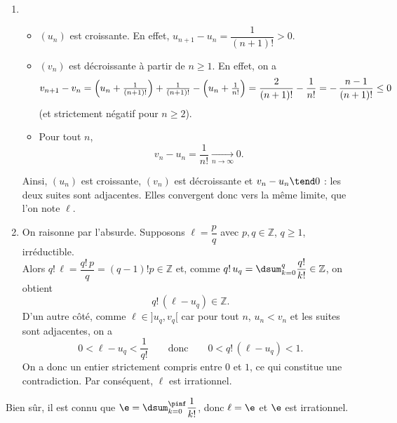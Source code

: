 \begin{enumerate}

\item
\begin{itemize}
\item $(u_n)$ est croissante. En effet, $u_{n+1}-u_n=\dfrac{1}{(n+1)!}>0$.
\item $(v_n)$ est décroissante à partir de $n\ge 1$. En effet, on a
\[
v_{n+1}-v_n
= \Bigl(u_n+\tfrac{1}{(n+1)!}\Bigr) + \tfrac{1}{(n+1)!} - \Bigl(u_n+\tfrac{1}{n!}\Bigr)
= \frac{2}{(n+1)!}-\frac{1}{n!}
= -\,\frac{n-1}{(n+1)!}\le 0
\]
(et strictement négatif pour $n\ge 2$).
\item Pour tout $n$,
\[
v_n-u_n=\frac{1}{n!}\xrightarrow[n\to\infty]{}0.
\]
\end{itemize}
Ainsi, $(u_n)$ est croissante, $(v_n)$ est décroissante et $v_n-u_n\tend0$ :
les deux suites sont adjacentes. Elles convergent donc vers la même limite, que l’on note $\ell$.

\item
On raisonne par l’absurde. Supposons $\ell=\dfrac{p}{q}$ avec $p,q\in\mathbb{Z}$, $q\ge 1$, irréductible.\\
Alors $q!\,\ell=\dfrac{q!\,p}{q}=(q-1)!p\in\mathbb{Z}$
et, comme $q!\,u_q=\dsum_{k=0}^q\dfrac{q!}{k!}\in\mathbb{Z}$, on obtient
\[
q!\,(\ell-u_q)\in\mathbb{Z}.
\]
D’un autre côté, comme $\ell\in]u_q,v_q[$ car pour tout $n$, $u_n<v_n$ et les suites sont adjacentes, on a
\[
0<\ell-u_q<\frac{1}{q!}\qquad\text{donc}\qquad 0<q!\,(\ell-u_q)<1.
\]
On a donc un entier strictement compris entre $0$ et $1$, ce qui constitue une contradiction. Par conséquent, $\ell$ est irrationnel.
\end{enumerate}
Bien sûr, il est connu que $\e=\dsum_{k=0}^{\pinf}\dfrac1{k!}$, donc $\ell=\e$ et $\e$ est irrationnel.
